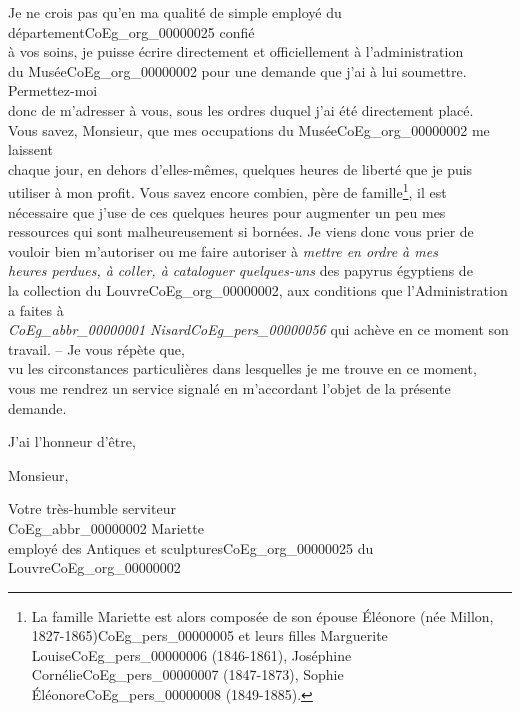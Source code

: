 \documentclass{book}
\begin{document}
\par Je ne crois pas qu’en ma qualité de simple employé du département\gls{CoEg_org_00000025} confié\\
à vos soins, je puisse écrire directement et officiellement à l’administration\\
du Musée\gls{CoEg_org_00000002} pour une demande que j’ai à lui soumettre. Permettez-moi\\
donc de m’adresser à vous, sous les ordres duquel j’ai été directement placé.\\
\indent Vous savez, Monsieur, que mes occupations du Musée\gls{CoEg_org_00000002} me laissent\\
chaque jour, en dehors d’elles-mêmes, quelques heures de liberté que je puis\\
utiliser à mon profit. Vous savez encore combien, père de famille\footnote{La famille Mariette est alors composée de son épouse Éléonore (née Millon, 1827-1865)\gls{CoEg_pers_00000005} et leurs filles Marguerite Louise\gls{CoEg_pers_00000006} (1846-1861), Joséphine Cornélie\gls{CoEg_pers_00000007} (1847-1873), Sophie Éléonore\gls{CoEg_pers_00000008} (1849-1885).}, il est\\
nécessaire que j’use de ces quelques heures pour augmenter un peu mes\\
ressources qui sont malheureusement si bornées. Je viens donc vous prier de\\
vouloir bien m’autoriser ou me faire autoriser à \textit{mettre en ordre à mes\\
heures perdues, à coller, à cataloguer quelques-uns} des papyrus égyptiens de\\
la collection du Louvre\gls{CoEg_org_00000002}, aux conditions que l’Administration a faites à\\
\textit{\gls{CoEg_abbr_00000001} Nisard\gls{CoEg_pers_00000056}} qui achève en ce moment son travail. – Je vous répète que,\\
vu les circonstances particulières dans lesquelles je me trouve en ce moment,\\
vous me rendrez un service signalé en m’accordant l’objet de la présente\\
demande.\\

\par J’ai l’honneur d’être,
\begin{center} Monsieur,\end{center}
\begin{center} \hspace{5cm}Votre très-humble serviteur\\
\hspace{5cm} \gls{CoEg_abbr_00000002} Mariette\\
\hspace{5cm} employé des Antiques et sculptures\gls{CoEg_org_00000025} du Louvre\gls{CoEg_org_00000002} \end{center}
\hypertarget{CoEg_Mariette_1850-07-08}{}
\end{document}
